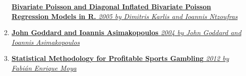 \documentclass[article]{jss}
\begin{document}
\begin{enumerate}
  \href{https://github.com/scibrokes/odds-modelling-and-testing-inefficiency-of-sports-bookmakers/blob/master/reference/KarlisNtzoufras2005.pdf}{\textbf{Bivariate
  Poisson and Diagonal Inflated Bivariate Poisson Regression Models in
  R.} \emph{2005 by Dimitris Karlis and Ioannis Ntzoufras}}
\item
  \href{https://github.com/scibrokes/odds-modelling-and-testing-inefficiency-of-sports-bookmakers/blob/master/reference/GoddardAsimakopoulos2004.pdf}{\textbf{John
  Goddard and Ioannis Asimakopoulos} \emph{2004 by John Goddard and
  Ioannis Asimakopoulos}}
\item
  \href{https://github.com/scibrokes/odds-modelling-and-testing-inefficiency-of-sports-bookmakers/blob/master/reference/Moya2012.pdf}{\textbf{Statistical
  Methodology for Profitable Sports Gambling} \emph{2012 by Fabián
  Enrique Moya}}
\end{enumerate}
\end{document}
